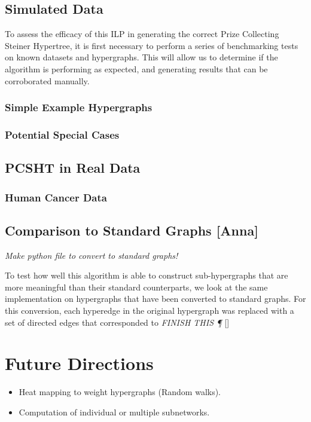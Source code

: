 \documentclass[12pt,twoside]{reedthesis}
\newcommand{\new}[2]{{\color{orange}#1 [#2]}}
\theoremstyle{definition}
\begin{document}
  \section{Simulated Data}

  To assess the efficacy of this ILP in generating the correct Prize Collecting Steiner Hypertree, it is first necessary to perform a series of benchmarking tests on known datasets and hypergraphs.  This will allow us to determine if the algorithm is performing as expected, and generating results that can be corroborated manually.\par

  \subsection{Simple Example Hypergraphs}

  \subsection{Potential Special Cases}

  \section{PCSHT in Real Data}

   \subsection{Human Cancer Data}

  \section{\new{Comparison to Standard Graphs}{Anna}}

  \emph{Make python file to convert to standard graphs!}

  \new{To test how well this algorithm is able to construct sub-hypergraphs that are more meaningful than their standard counterparts, we look at the same implementation on hypergraphs that have been converted to standard graphs. For this conversion, each hyperedge in the original hypergraph was replaced with a set of directed edges that corresponded to \emph{FINISH THIS \P}}{}

\chapter{Future Directions}
 \begin{itemize}
   \item{Heat mapping to weight hypergraphs (Random walks).}
   \item{Computation of individual or multiple subnetworks.}
 \end{itemize}
\end{document}
